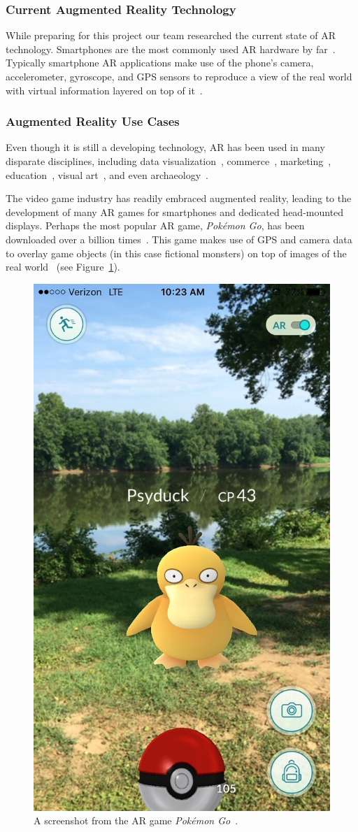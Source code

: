 \documentclass[a4paper, 10pt, american, titlepage]{article}
\begin{document}
\subsubsection{Current Augmented Reality Technology}
\label{sec:currentAugmentedRealityTechnology}

While preparing for this project our team researched the current state of AR
technology. Smartphones are the most commonly used AR hardware by
far~\autocite{boland2018}. Typically smartphone AR applications make use of the
phone's camera, accelerometer, gyroscope, and GPS sensors to reproduce a view
of the real world with virtual information layered on top of
it~\autocite{bonsor2018}.

\subsubsection{Augmented Reality Use Cases}
\label{sec:augmentedRealityUseCases}

Even though it is still a developing technology, AR has been used in many
disparate disciplines, including data visualization~\autocite{resnick2017},
commerce~\autocite{matney2018}, marketing~\autocite{sharma2015},
education~\autocite{stewart-smith2012}, visual art~\autocite{katz2018}, and
even archaeology~\autocite{eve2012}.

The video game industry has readily embraced augmented reality, leading to the
development of many AR games for smartphones and dedicated head-mounted
displays. Perhaps the most popular AR game, \textit{Pokémon Go}, has been
downloaded over a billion times~\autocite{webster2018}. This game makes use of
GPS and camera data to overlay game objects (in this case fictional monsters) on
top of images of the real world~\autocite{concepcion2016} (see
Figure~\ref{fig:pokemonGo}).

\begin{figure}[h]
	\centering
	\includegraphics[width=.5\textwidth]{pokemon-go.jpg}
	\caption[A screenshot from the AR game \textit{Pokémon Go}]{A screenshot
		from the AR game \textit{Pokémon Go}~\autocite{vastateparks2016}.}
	\label{fig:pokemonGo}
\end{figure}
\end{document}
